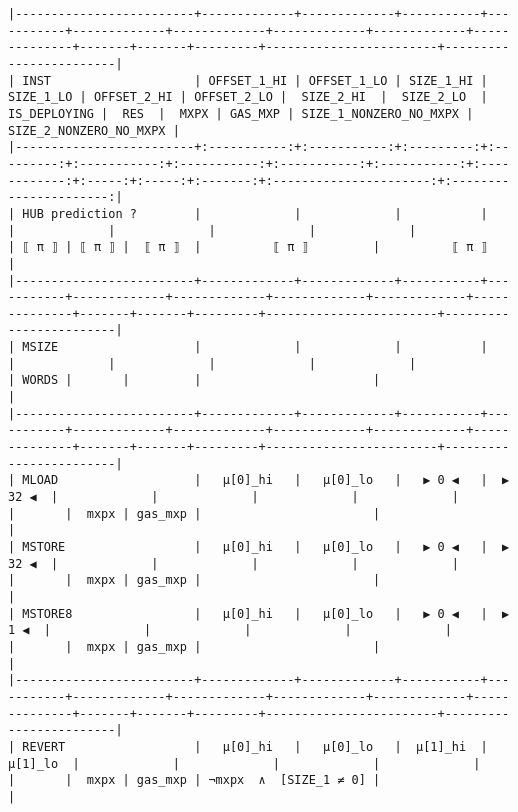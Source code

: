 \documentclass[varwidth=\maxdimen,margin=0.5cm,multi={verbatim}]{standalone}
\begin{document}
\begin{verbatim}
|-------------------------+-------------+-------------+-----------+-----------+-------------+-------------+-------------+-------------+--------------+-------+-------+---------+------------------------+------------------------|
| INST                    | OFFSET_1_HI | OFFSET_1_LO | SIZE_1_HI | SIZE_1_LO | OFFSET_2_HI | OFFSET_2_LO |  SIZE_2_HI  |  SIZE_2_LO  | IS_DEPLOYING |  RES  |  MXPX | GAS_MXP | SIZE_1_NONZERO_NO_MXPX | SIZE_2_NONZERO_NO_MXPX |
|-------------------------+:-----------:+:-----------:+:---------:+:---------:+:-----------:+:-----------:+:-----------:+:-----------:+:------------:+:-----:+:-----:+:-------:+:----------------------:+:----------------------:|
| HUB prediction ?        |             |             |           |           |             |             |             |             |              | ⟦ π ⟧ | ⟦ π ⟧ |  ⟦ π ⟧  |          ⟦ π ⟧         |          ⟦ π ⟧         |
|-------------------------+-------------+-------------+-----------+-----------+-------------+-------------+-------------+-------------+--------------+-------+-------+---------+------------------------+------------------------|
| MSIZE                   |             |             |           |           |             |             |             |             |              | WORDS |       |         |                        |                        |
|-------------------------+-------------+-------------+-----------+-----------+-------------+-------------+-------------+-------------+--------------+-------+-------+---------+------------------------+------------------------|
| MLOAD                   |   μ[0]_hi   |   μ[0]_lo   |   ▶ 0 ◀   |  ▶  32 ◀  |             |             |             |             |              |       |  mxpx | gas_mxp |                        |                        |
| MSTORE                  |   μ[0]_hi   |   μ[0]_lo   |   ▶ 0 ◀   |  ▶  32 ◀  |             |             |             |             |              |       |  mxpx | gas_mxp |                        |                        |
| MSTORE8                 |   μ[0]_hi   |   μ[0]_lo   |   ▶ 0 ◀   |  ▶   1 ◀  |             |             |             |             |              |       |  mxpx | gas_mxp |                        |                        |
|-------------------------+-------------+-------------+-----------+-----------+-------------+-------------+-------------+-------------+--------------+-------+-------+---------+------------------------+------------------------|
| REVERT                  |   μ[0]_hi   |   μ[0]_lo   |  μ[1]_hi  |  μ[1]_lo  |             |             |             |             |              |       |  mxpx | gas_mxp | ¬mxpx  ∧  [SIZE_1 ≠ 0] |                        |

\end{verbatim}
\end{document}
